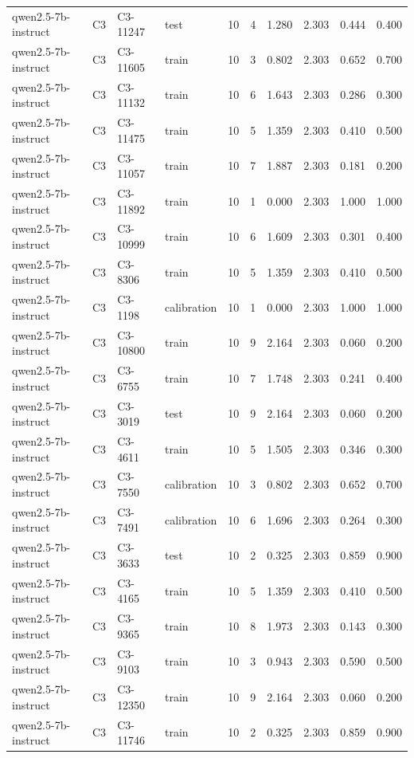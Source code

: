 \begin{table}
\begin{tabular}{llllrrrrrr}
qwen2.5-7b-instruct & C3 & C3-11247 & test & 10 & 4 & 1.280 & 2.303 & 0.444 & 0.400 \\
qwen2.5-7b-instruct & C3 & C3-11605 & train & 10 & 3 & 0.802 & 2.303 & 0.652 & 0.700 \\
qwen2.5-7b-instruct & C3 & C3-11132 & train & 10 & 6 & 1.643 & 2.303 & 0.286 & 0.300 \\
qwen2.5-7b-instruct & C3 & C3-11475 & train & 10 & 5 & 1.359 & 2.303 & 0.410 & 0.500 \\
qwen2.5-7b-instruct & C3 & C3-11057 & train & 10 & 7 & 1.887 & 2.303 & 0.181 & 0.200 \\
qwen2.5-7b-instruct & C3 & C3-11892 & train & 10 & 1 & 0.000 & 2.303 & 1.000 & 1.000 \\
qwen2.5-7b-instruct & C3 & C3-10999 & train & 10 & 6 & 1.609 & 2.303 & 0.301 & 0.400 \\
qwen2.5-7b-instruct & C3 & C3-8306 & train & 10 & 5 & 1.359 & 2.303 & 0.410 & 0.500 \\
qwen2.5-7b-instruct & C3 & C3-1198 & calibration & 10 & 1 & 0.000 & 2.303 & 1.000 & 1.000 \\
qwen2.5-7b-instruct & C3 & C3-10800 & train & 10 & 9 & 2.164 & 2.303 & 0.060 & 0.200 \\
qwen2.5-7b-instruct & C3 & C3-6755 & train & 10 & 7 & 1.748 & 2.303 & 0.241 & 0.400 \\
qwen2.5-7b-instruct & C3 & C3-3019 & test & 10 & 9 & 2.164 & 2.303 & 0.060 & 0.200 \\
qwen2.5-7b-instruct & C3 & C3-4611 & train & 10 & 5 & 1.505 & 2.303 & 0.346 & 0.300 \\
qwen2.5-7b-instruct & C3 & C3-7550 & calibration & 10 & 3 & 0.802 & 2.303 & 0.652 & 0.700 \\
qwen2.5-7b-instruct & C3 & C3-7491 & calibration & 10 & 6 & 1.696 & 2.303 & 0.264 & 0.300 \\
qwen2.5-7b-instruct & C3 & C3-3633 & test & 10 & 2 & 0.325 & 2.303 & 0.859 & 0.900 \\
qwen2.5-7b-instruct & C3 & C3-4165 & train & 10 & 5 & 1.359 & 2.303 & 0.410 & 0.500 \\
qwen2.5-7b-instruct & C3 & C3-9365 & train & 10 & 8 & 1.973 & 2.303 & 0.143 & 0.300 \\
qwen2.5-7b-instruct & C3 & C3-9103 & train & 10 & 3 & 0.943 & 2.303 & 0.590 & 0.500 \\
qwen2.5-7b-instruct & C3 & C3-12350 & train & 10 & 9 & 2.164 & 2.303 & 0.060 & 0.200 \\
qwen2.5-7b-instruct & C3 & C3-11746 & train & 10 & 2 & 0.325 & 2.303 & 0.859 & 0.900 \\

\end{tabular}
\end{table}
